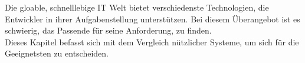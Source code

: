 
Die gloable, schnelllebige IT Welt bietet verschiedenste Technologien, die Entwickler in ihrer Aufgabenstellung unterstützen. Bei diesem Überangebot ist es schwierig, das Passende für seine Anforderung, zu finden.\\
Dieses Kapitel befasst sich mit dem Vergleich nützlicher Systeme, um sich für die Geeignetsten zu entscheiden.